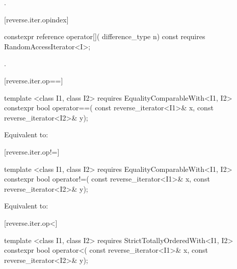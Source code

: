 \begin{itemdescr}
\pnum
\effects
{}

\pnum
\returns
{}.
\end{itemdescr}

[reverse.iter.opindex]{}

%
\begin{itemdecl}
constexpr reference operator[](
  difference_type n) const
    requires RandomAccessIterator<I>;
\end{itemdecl}

\begin{itemdescr}
\pnum
\returns
{}.
\end{itemdescr}

[reverse.iter.op==]{}

%
\begin{itemdecl}
template <class I1, class I2>
    requires EqualityComparableWith<I1, I2>
  constexpr bool operator==(
    const reverse_iterator<I1>& x,
    const reverse_iterator<I2>& y);
\end{itemdecl}

\begin{itemdescr}
\pnum
\effects Equivalent to:
\end{itemdescr}

[reverse.iter.op!=]{}

%
\begin{itemdecl}
template <class I1, class I2>
    requires EqualityComparableWith<I1, I2>
  constexpr bool operator!=(
    const reverse_iterator<I1>& x,
    const reverse_iterator<I2>& y);
\end{itemdecl}

\begin{itemdescr}
\pnum
\effects Equivalent to:
\end{itemdescr}

[reverse.iter.op<]{}

%
\begin{itemdecl}
template <class I1, class I2>
    requires StrictTotallyOrderedWith<I1, I2>
  constexpr bool operator<(
    const reverse_iterator<I1>& x,
    const reverse_iterator<I2>& y);
\end{itemdecl}

